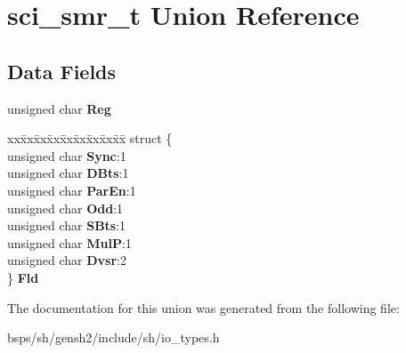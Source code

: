\hypertarget{unionsci__smr__t}{}\section{sci\+\_\+smr\+\_\+t Union Reference}
\label{unionsci__smr__t}
\subsection*{Data Fields}
\begin{DoxyCompactItemize}
\item 
\mbox{\label{unionsci__smr__t_a0ac08090cf11b5fe458214230c98a041}} 
unsigned char {\bfseries Reg}
\item 
\mbox{\label{unionsci__smr__t_ad879098db75b8244e509ec4e16746f4d}} 
\begin{tabbing}
xx\=xx\=xx\=xx\=xx\=xx\=xx\=xx\=xx\=\kill
struct \{\\
\>unsigned char {\bfseries Sync}:1\\
\>unsigned char {\bfseries DBts}:1\\
\>unsigned char {\bfseries ParEn}:1\\
\>unsigned char {\bfseries Odd}:1\\
\>unsigned char {\bfseries SBts}:1\\
\>unsigned char {\bfseries MulP}:1\\
\>unsigned char {\bfseries Dvsr}:2\\
\} {\bfseries Fld}\\

\end{tabbing}\end{DoxyCompactItemize}


The documentation for this union was generated from the following file\+:\begin{DoxyCompactItemize}
\item 
bsps/sh/gensh2/include/sh/io\+\_\+types.\+h\end{DoxyCompactItemize}
